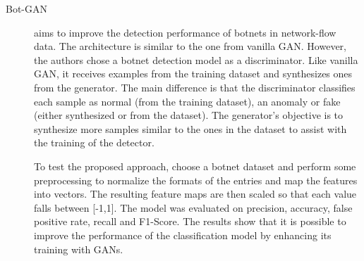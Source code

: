 \begin{description}
    \item[Bot-GAN \cite{yin.etal_EnhancingFrameworkBotnet_2018}] aims to improve the detection performance of botnets in network-flow data. The architecture is similar to the one from vanilla GAN. However, the authors chose a botnet detection model as a discriminator. Like vanilla GAN, it receives examples from the training dataset and synthesizes ones from the generator. The main difference is that the discriminator classifies each sample as normal (from the training dataset), an anomaly or fake (either synthesized or from the dataset). The generator's objective is to synthesize more samples similar to the ones in the dataset to assist with the training of the detector.

    To test the proposed approach, choose a botnet dataset and perform some preprocessing to normalize the formats of the entries and map the features into vectors. The resulting feature maps are then scaled so that each value falls between [-1,1]. The model was evaluated on precision, accuracy, false positive rate, recall and F1-Score. The results show that it is possible to improve the performance of the classification model by enhancing its training with GANs.
\end{description}


